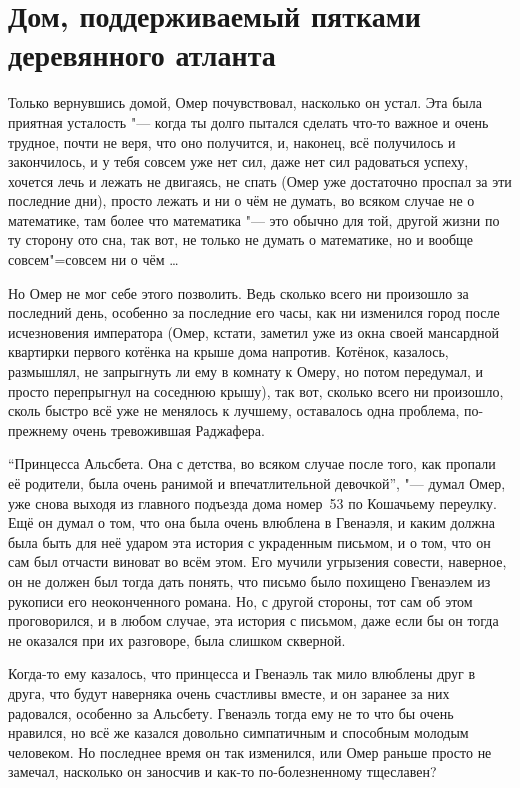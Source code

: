 \section{Дом, поддерживаемый пятками деревянного атланта}

Только вернувшись домой, Омер почувствовал, насколько он устал.
Эта была приятная усталость "--- когда ты долго пытался сделать что-то важное и
очень трудное, почти не веря, что оно получится, и, наконец, всё получилось и
закончилось, и у тебя совсем уже нет сил, даже нет сил радоваться успеху,
хочется лечь и лежать не двигаясь, не спать (Омер уже достаточно проспал за эти
последние дни), просто лежать и ни о чём не думать, во всяком случае не о
математике, там более что математика "--- это обычно для той, другой жизни по ту
сторону ото сна, так вот, не только не думать о математике, но и вообще
совсем"=совсем ни о чём \ldots

Но Омер не мог себе этого позволить.
Ведь сколько всего ни произошло за последний день, особенно за последние его
часы, как ни изменился город после исчезновения императора (Омер, кстати,
заметил уже из окна своей мансардной квартирки первого котёнка на крыше дома
напротив. Котёнок, казалось, размышлял, не запрыгнуть ли ему в комнату к Омеру,
но потом передумал, и просто перепрыгнул на соседнюю крышу), так вот, сколько
всего ни произошло, сколь быстро всё уже не менялось к лучшему, оставалось одна
проблема, по-прежнему очень тревожившая Раджафера.

\enquote{Принцесса Альсбета.
Она с детства, во всяком случае после того, как пропали её родители, была очень
ранимой и впечатлительной девочкой}, "--- думал Омер, уже снова выходя из
главного подъезда дома номер~53 по Кошачьему переулку.
Ещё он думал о том, что она была очень влюблена в Гвенаэля, и каким должна была
быть для неё ударом эта история с украденным письмом, и о том, что он сам был
отчасти виноват во всём этом.
Его мучили угрызения совести, наверное, он не должен был тогда дать понять, что
письмо было похищено Гвенаэлем из рукописи его неоконченного романа.
Но, с другой стороны, тот сам об этом проговорился, и в любом случае, эта
история с письмом, даже если бы он тогда не оказался при их разговоре, была
слишком скверной.

Когда-то ему казалось, что принцесса и Гвенаэль так мило влюблены друг в друга,
что будут наверняка очень счастливы вместе, и он заранее за них радовался,
особенно за Альсбету.
Гвенаэль тогда ему не то что бы очень нравился, но всё же казался довольно
симпатичным и способным молодым человеком.
Но последнее время он так изменился, или Омер раньше просто не замечал,
насколько он заносчив и как-то по-болезненному тщеславен?

